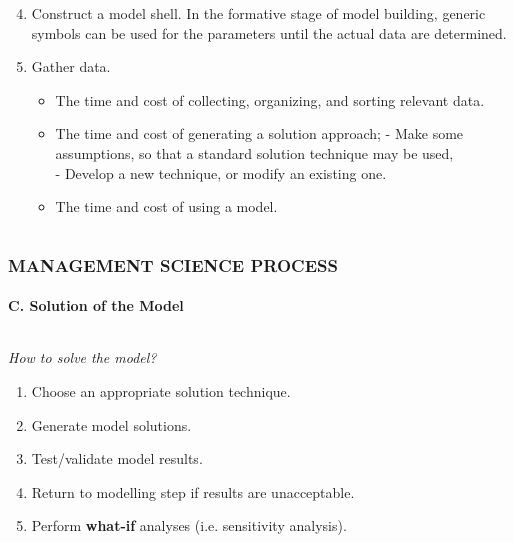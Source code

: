 \documentclass[14 pt]{beamer}
\begin{document}
\begin{frame}[t]
\begin{columns}[t]
\begin{column}{0.45\textwidth}
\vskip0.5cm%
\begin{enumerate}
  \setcounter{enumi}{3}
  \item Construct a model shell.
\vskip0.5cm%
In the formative stage of model building, generic symbols can be used for the parameters until the actual data are determined.
\vskip0.5cm%
  \item Gather data.
\vskip0.5cm%
\begin{itemize}
  \item The time and cost of collecting, organizing, and sorting relevant data.
  \item The time and cost of generating a solution approach; 
\vskip0.5cm%
- Make some assumptions, so that a standard solution technique may be used, \\
- Develop a new technique, or modify an existing one.
\vskip0.5cm%
  \item The time and cost of using a model.  
\end{itemize}
\end{enumerate}
\end{column}
\end{columns}
\end{frame}


\begin{frame}[t]
\frametitle{MANAGEMENT SCIENCE PROCESS}
\framesubtitle{C. Solution of the Model}

\begin{columns}[t]
\begin{column}{0.45\textwidth}
\emph{How to solve the model?}
\vskip0.5cm%
\begin{enumerate}
  \item Choose an appropriate solution technique.
  \item Generate model solutions.
  \item Test/validate model results.
  \item Return to modelling step if results are unacceptable.
  \item Perform \textbf{what-if} analyses (i.e. sensitivity analysis).
\end{enumerate}
\end{column}

\begin{column}{0.45\textwidth}
\end{column}
\end{columns}
\end{frame}
\end{document}
